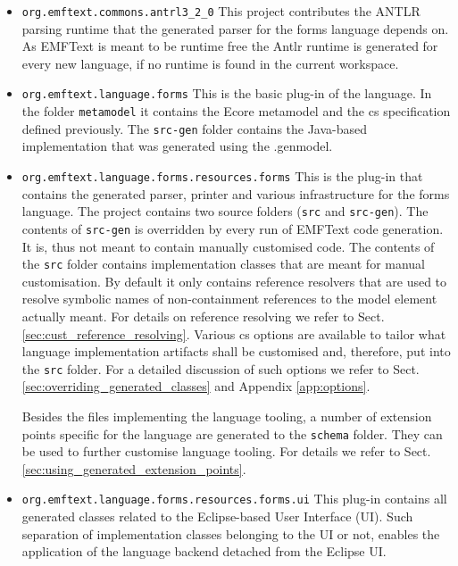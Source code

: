 	\begin{itemize} 
	  \item \texttt{org.emftext.commons.antrl3\_2\_0} This project contributes the
	  ANTLR parsing runtime that the generated parser for the forms language
	  depends on. As EMFText is meant to be runtime free the Antlr runtime is generated
	  for every new language, if no runtime is found in the current workspace.
	  \item \texttt{org.emftext.language.forms} This is the basic plug-in of the
	  language. In the folder \texttt{metamodel} it contains the Ecore metamodel
	  and the cs specification defined previously. The \texttt{src-gen} folder contains the Java-based implementation that was
	  generated using the .genmodel.
	  \item \texttt{org.emftext.language.forms.resources.forms}
	  This is the plug-in that contains the generated parser, printer and various
	  infrastructure for the forms language. The project contains two source
	  folders (\texttt{src} and \texttt{src-gen}). The contents of \texttt{src-gen}
	  is overridden by every run of EMFText code generation. It is, thus not meant
	  to contain manually customised code. The contents of the \texttt{src} folder
	  contains implementation classes that are meant for manual customisation. By
	  default it only contains reference resolvers that are used to resolve
	  symbolic names of non-containment references to the model element actually
	  meant. For details on reference resolving we refer to Sect.
	  \ref{sec:cust_reference_resolving}. Various cs options are available to
	  tailor what language implementation artifacts shall be customised and, therefore, 
	  put into the \texttt{src} folder. For a
	  detailed discussion of such options we refer to Sect. \ref{sec:overriding_generated_classes} and
	  Appendix \ref{app:options}.
	  
	  Besides the files implementing the language tooling, a number of extension
	  points specific for the language are generated to the \texttt{schema} folder. 
	  They can be used to further customise language tooling. For details we refer
	  to Sect. \ref{sec:using_generated_extension_points}.
	  
	  \item \texttt{org.emftext.language.forms.resources.forms.ui} This plug-in 
	  contains all generated classes related to the Eclipse-based User Interface
	  (UI). Such separation of implementation classes belonging to the UI or not,
	  enables the application of the language backend detached from the Eclipse UI.
	\end{itemize}
	
